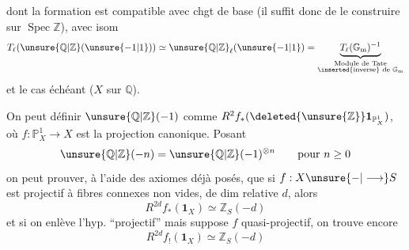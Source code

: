 dont la formation est compatible avec chgt
de base (il suffit donc de le construire
sur $\operatorname{Spec}\mathbb{Z}$), avec  isom
\[
 T_\ell(\unsure{\mathbb{Q}|\mathbb{Z}}(\unsure{-1|1}))
 \simeq \unsure{\mathbb{Q}|\mathbb{Z}}_\ell(\unsure{-1|1})
 =\underbrace{T_\ell(\mathbb{G}_{\mathrm m})^{-1}}_{
 \substack{\text{Module de Tate}\\\text{\inserted{inverse} de }\mathbb{G}_{\mathrm m}}}
\]
et le cas échéant ($X$ sur $\mathbb{Q}$).

On peut définir $\unsure{\mathbb{Q}|\mathbb{Z}}(-1)$ comme
$R^2f_*(\deleted{\unsure{\mathbb{Z}}}\mathbf1_{\mathbb{P}^1_X})$,
où $f:\mathbb{P}^1_X\longrightarrow X$ est la
projection canonique. Posant
\[
 \unsure{\mathbb{Q}|\mathbb{Z}}(-n)=\unsure{\mathbb{Q}|\mathbb{Z}}(-1)^{\otimes n}
 \qquad\text{pour }n\ge0
\]
on peut prouver, à l'aide des
axiomes déjà posés, que si $f:X\unsure{-|\longrightarrow}S$
est  projectif à fibres  connexes non vides,
 de dim relative $d$, alors
\[
 R^{2d}f_*(\mathbf1_X)\simeq\mathbb{Z}_S(-d)
\]
et si on enlève l'hyp. ``projectif'' mais
suppose $f$ quasi-projectif, on trouve encore
\[
 R^{2d}f_!(\mathbf1_X)\simeq\mathbb{Z}_S(-d)
\]
